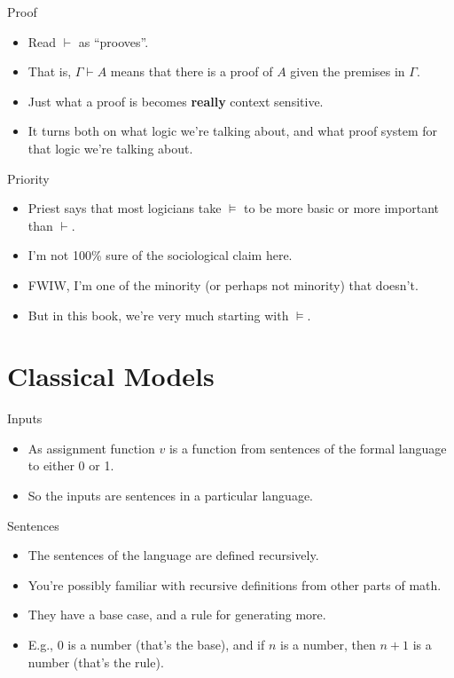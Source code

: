 \documentclass[
  17pt,
  letterpaper,
  ignorenonframetext,
  aspectratio=169,
]{beamer}
\providecommand{\tightlist}{%
  \setlength{\itemsep}{0pt}\setlength{\parskip}{0pt}}\usepackage{longtable,booktabs,array}
\begin{document}
\begin{frame}{Proof}
\protect\hypertarget{proof}{}
\begin{itemize}[<+->]
\tightlist
\item
  Read \(\vdash\) as ``prooves''.
\item
  That is, \(\Gamma \vdash A\) means that there is a proof of \(A\)
  given the premises in \(\Gamma\).
\item
  Just what a proof is becomes \textbf{really} context sensitive.
\item
  It turns both on what logic we're talking about, and what proof system
  for that logic we're talking about.
\end{itemize}
\end{frame}

\begin{frame}{Priority}
\protect\hypertarget{priority}{}
\begin{itemize}[<+->]
\tightlist
\item
  Priest says that most logicians take \(\vDash\) to be more basic or
  more important than \(\vdash\).
\item
  I'm not 100\% sure of the sociological claim here.
\item
  FWIW, I'm one of the minority (or perhaps not minority) that doesn't.
\item
  But in this book, we're very much starting with \(\vDash\).
\end{itemize}
\end{frame}

\hypertarget{classical-models}{%
\section{Classical Models}\label{classical-models}}

\begin{frame}{Inputs}
\protect\hypertarget{inputs}{}
\begin{itemize}[<+->]
\tightlist
\item
  As assignment function \(v\) is a function from sentences of the
  formal language to either 0 or 1.
\item
  So the inputs are sentences in a particular language.
\end{itemize}
\end{frame}

\begin{frame}{Sentences}
\protect\hypertarget{sentences}{}
\begin{itemize}[<+->]
\tightlist
\item
  The sentences of the language are defined recursively.
\item
  You're possibly familiar with recursive definitions from other parts
  of math.
\item
  They have a base case, and a rule for generating more.
\item
  E.g., 0 is a number (that's the base), and if \(n\) is a number, then
  \(n+1\) is a number (that's the rule).
\end{itemize}
\end{frame}
\end{document}
